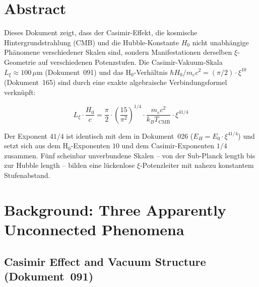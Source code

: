 
\section*{Abstract}

Dieses Dokument zeigt, dass der Casimir-Effekt, die kosmische Hintergrundstrahlung (CMB)
und die Hubble-Konstante $H_0$ nicht unabhängige Phänomene verschiedener Skalen sind,
sondern Manifestationen derselben $\xi$-Geometrie auf verschiedenen Potenzstufen.
Die Casimir-Vakuum-Skala $L_\xi \approx 100\,\mu\text{m}$ (Dokument~091) und das
H$_0$-Verhältnis $\hbar H_0 / m_e c^2 = (\pi/2)\cdot\xi^{10}$ (Dokument~165)
sind durch eine exakte algebraische Verbindungsformel verknüpft:

\begin{equation}
    \boxed{L_\xi \cdot \frac{H_0}{c}
    = \frac{\pi}{2}\cdot\left(\frac{15}{\pi^2}\right)^{\!1/4}
    \cdot \frac{m_e c^2}{k_B T_\text{CMB}} \cdot \xi^{41/4}}
    \label{eq:bridge_main}
\end{equation}

Der Exponent $41/4$ ist identisch mit dem in Dokument~026 ($E_H = E_0 \cdot \xi^{41/4}$)
und setzt sich aus dem H$_0$-Exponenten $10$ und dem Casimir-Exponenten $1/4$ zusammen.
Fünf scheinbar unverbundene Skalen -- von der Sub-Planck length bis zur Hubble length --
bilden eine lückenlose $\xi$-Potenzleiter mit nahezu konstantem Stufenabstand.

\clearpage

\section{Background: Three Apparently Unconnected Phenomena}
\label{sec:background}

\subsection{Casimir Effect and Vacuum Structure (Dokument~091)}

